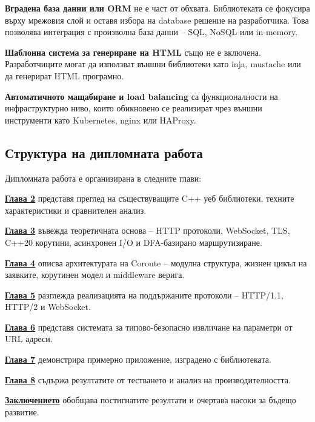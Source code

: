 \textbf{Вградена база данни или ORM} не е част от обхвата. Библиотеката се фокусира върху мрежовия слой и оставя избора на database решение на разработчика. Това позволява интеграция с произволна база данни -- SQL, NoSQL или in-memory.

\textbf{Шаблонна система за генериране на HTML} също не е включена. Разработчиците могат да използват външни библиотеки като inja, mustache или да генерират HTML програмно.

\textbf{Автоматичното мащабиране и load balancing} са функционалности на инфраструктурно ниво, които обикновено се реализират чрез външни инструменти като Kubernetes, nginx или HAProxy.

\subsection{Структура на дипломната работа}

Дипломната работа е организирана в следните глави:

\textbf{\hyperref[sec:existing_solutions]{Глава 2}} представя преглед на съществуващите C++ уеб библиотеки, техните характеристики и сравнителен анализ.

\textbf{\hyperref[sec:theoretical_background]{Глава 3}} въвежда теоретичната основа -- HTTP протоколи, WebSocket, TLS, C++20 корутини, асинхронен I/O и DFA-базирано маршрутизиране.

\textbf{\hyperref[sec:architecture]{Глава 4}} описва архитектурата на Coroute -- модулна структура, жизнен цикъл на заявките, корутинен модел и middleware верига.

\textbf{\hyperref[sec:protocols]{Глава 5}} разглежда реализацията на поддържаните протоколи -- HTTP/1.1, HTTP/2 и WebSocket.

\textbf{\hyperref[sec:type_safe_params]{Глава 6}} представя системата за типово-безопасно извличане на параметри от URL адреси.

\textbf{\hyperref[sec:example_app]{Глава 7}} демонстрира примерно приложение, изградено с библиотеката.

\textbf{\hyperref[sec:testing]{Глава 8}} съдържа резултатите от тестването и анализ на производителността.

\textbf{\hyperref[sec:conclusion]{Заключението}} обобщава постигнатите резултати и очертава насоки за бъдещо развитие.
